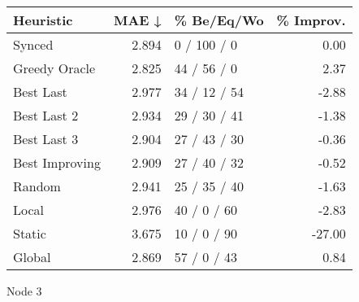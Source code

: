 \begin{tabular}{lrlr}
\toprule
\textbf{Heuristic} & \textbf{MAE ↓} & \textbf{\% Be/Eq/Wo} & \textbf{\% Improv.} \\
\midrule
            Synced &          2.894 &          0 / 100 / 0 &                0.00 \\
     Greedy Oracle &          2.825 &          44 / 56 / 0 &                2.37 \\
         Best Last &          2.977 &         34 / 12 / 54 &               -2.88 \\
       Best Last 2 &          2.934 &         29 / 30 / 41 &               -1.38 \\
       Best Last 3 &          2.904 &         27 / 43 / 30 &               -0.36 \\
    Best Improving &          2.909 &         27 / 40 / 32 &               -0.52 \\
            Random &          2.941 &         25 / 35 / 40 &               -1.63 \\
             Local &          2.976 &          40 / 0 / 60 &               -2.83 \\
            Static &          3.675 &          10 / 0 / 90 &              -27.00 \\
            Global &          2.869 &          57 / 0 / 43 &                0.84 \\
\bottomrule
\end{tabular}
\caption{Node 3}
\label{tab:hr_non_lr05_le2_bs4_3}
